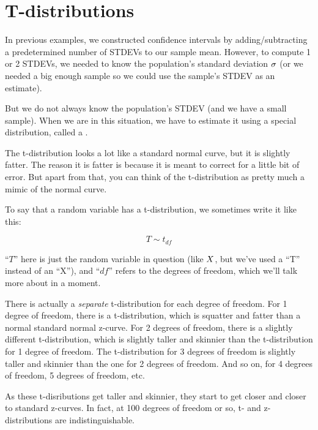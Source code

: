 \documentclass[../../../main.tex]{subfiles}
\begin{document}
\chapter{T-distributions}

In previous examples, we constructed confidence intervals by adding/subtracting a predetermined number of STDEVs to our sample mean. However, to compute 1 or 2 STDEVs, we needed to know the population's standard deviation $\sigma$ (or we needed a big enough sample so we could use the sample's STDEV as an estimate).

But we do not always know the population's STDEV (and we have a small sample). When we are in this situation, we have to estimate it using a special distribution, called a .

The t-distribution looks a lot like a standard normal curve, but it is slightly fatter. The reason it is fatter is because it is meant to correct for a little bit of error. But apart from that, you can think of the t-distribution as pretty much a mimic of the normal curve.

To say that a random variable has a t-distribution, we sometimes write it like this:

\begin{equation*}
  T \sim t_{df}
\end{equation*}

\noindent
``$T$'' here is just the random variable in question (like $\RandVar/$, but we've used a ``T'' instead of an ``X''), and ``$df$'' refers to the degrees of freedom, which we'll talk more about in a moment.

There is actually a \emph{separate} t-distribution for each degree of freedom. For 1 degree of freedom, there is a t-distribution, which is squatter and fatter than a normal standard normal z-curve. For 2 degrees of freedom, there is a slightly different t-distribution, which is slightly taller and skinnier than the t-distribution for 1 degree of freedom. The t-distribution for 3 degrees of freedom is slightly taller and skinnier than the one for 2 degrees of freedom. And so on, for 4 degrees of freedom, 5 degrees of freedom, etc. 

As these t-disributions get taller and skinnier, they start to get closer and closer to standard z-curves. In fact, at 100 degrees of freedom or so, t- and z-distributions are indistinguishable. 
\end{document}
